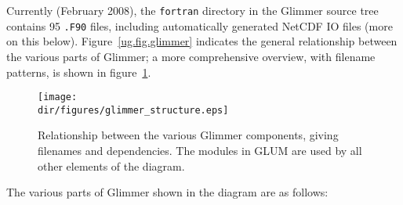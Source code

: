 Currently (February 2008), the \texttt{fortran} directory in the Glimmer source
tree contains 95 \texttt{.F90} files, including automatically generated
NetCDF IO files (more on this below). Figure~\ref{ug.fig.glimmer} indicates
the general relationship between the various parts of Glimmer; a more
comprehensive overview, with filename patterns, is shown in
figure~\ref{dg.fig.glimmer_structure}. 
%
\begin{figure}[htbp]
  \centering
  \texttt{[image: \\dir/figures/glimmer\_structure.eps]}
  \caption{Relationship between the various Glimmer components, giving
  filenames and dependencies. The modules in GLUM are used by all other
  elements of the diagram.}
  \label{dg.fig.glimmer_structure}
\end{figure}
%
The various parts of Glimmer shown in the diagram are as follows:
%
